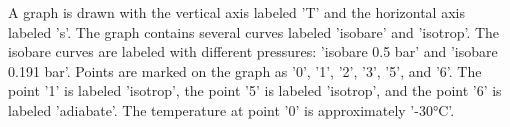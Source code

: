 A graph is drawn with the vertical axis labeled 'T' and the horizontal axis labeled 's'. The graph contains several curves labeled 'isobare' and 'isotrop'. The isobare curves are labeled with different pressures: 'isobare 0.5 bar' and 'isobare 0.191 bar'. Points are marked on the graph as '0', '1', '2', '3', '5', and '6'. The point '1' is labeled 'isotrop', the point '5' is labeled 'isotrop', and the point '6' is labeled 'adiabate'. The temperature at point '0' is approximately '-30°C'.